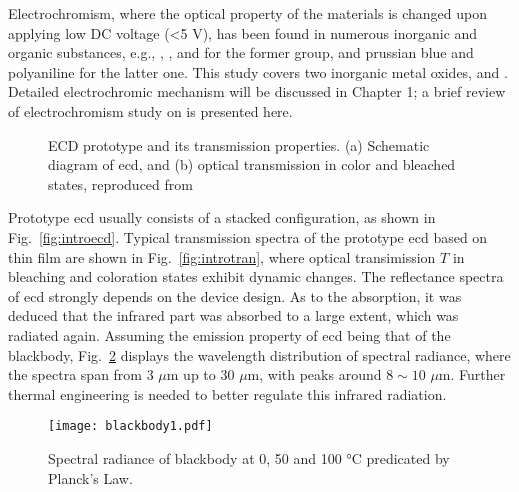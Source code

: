 Electrochromism, where the optical property of the materials is changed upon applying low DC voltage (\textless 5 V), has been found in numerous inorganic and organic substances, e.g., , , and  for the former group, and prussian blue and polyaniline for the latter one. This study covers two inorganic metal oxides,  and . Detailed electrochromic mechanism will be discussed in Chapter 1; a brief review of electrochromism study on  is presented here. 
\begin{figure}[htb]
\centering
{}\hspace{0.04\textwidth}
\caption[ECD prototype and its transmission properties]{ECD prototype and its transmission properties. (a) Schematic diagram of \gls{ecd}, and (b) optical transmission in color and bleached states, reproduced from \cite{Lampert1998}}
\label{fig:introec}
\end{figure}

Prototype \gls{ecd} usually consists of a stacked configuration, as shown in Fig.~\ref{fig:introecd}. Typical transmission spectra of the prototype \gls{ecd} based on  thin film are shown in Fig.~\ref{fig:introtran},\cite{Lampert1998} where optical transimission $T$ in bleaching and coloration states exhibit dynamic changes. The reflectance spectra of  \gls{ecd} strongly depends on the device design.\cite{OBrien1999} As to the absorption, it was deduced that the infrared part was absorbed to a large extent, which was radiated again. Assuming the emission property of \gls{ecd} being that of the blackbody, Fig.~\ref{fig:introbb} displays the wavelength distribution of spectral radiance, where the spectra span from 3 $\mu$m up to 30 $\mu$m, with peaks around $8\sim10$ $\mu$m. Further thermal engineering is needed to better regulate this infrared radiation. 

\begin{figure}[htb]
\centering
\texttt{[image: blackbody1.pdf]}
\caption[Spectral radiance of blackbody at 0, 50 and 100 \si{\degreeCelsius}]{Spectral radiance of blackbody at 0, 50 and 100 \si{\degreeCelsius} predicated by Planck's Law.}
\label{fig:introbb}
\end{figure}

